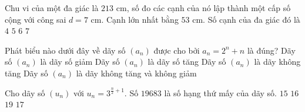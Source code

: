 \begin{ex}%
Chu vi của một đa giác là $213$ cm, số đo các cạnh của nó lập thành một cấp số cộng với công sai $d=7$ cm. Cạnh lớn nhất bằng $53$ cm. Số cạnh của đa giác đó là
\choice
{ $4$}
{$5$}
{\True $6$}
{$7$}
\end{ex}

\begin{ex}%
Phát biểu nào dưới đây về dãy số $\left(a_{n}\right)$ được cho bởi $a_{n}=2^{n}+n$ là đúng?
\choice
{Dãy số $\left(a_{n}\right)$ là dãy số giảm}
{\True Dãy số $\left(a_{n}\right)$ là dãy số tăng}
{Dãy số $\left(a_{n}\right)$ là dãy không tăng}
{Dãy số $\left(a_{n}\right)$ là dãy không tăng và không giảm}
\end{ex}

\begin{ex}%
Cho dãy số $\left(u_{n}\right)$ với $u_{n}=3^{\tfrac{n}{2}+1}$. Số $19683$ là số hạng thứ mấy của dãy số.
\choice
{$15$}
{\True $16$}
{$19$}
{$17$}
\end{ex}

